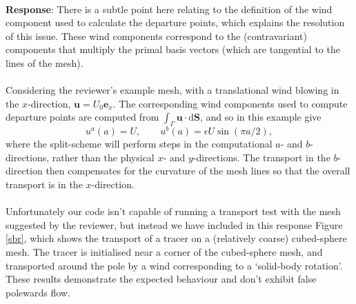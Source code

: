 \documentclass[11pt,a4paper]{article}
\begin{document}
\\
\textbf{Response}: There is a subtle point here relating to the definition of the wind component used to calculate the departure points, which explains the resolution of this issue. These wind components correspond to the (contravariant) components that multiply the primal basis vectors (which are tangential to the lines of the mesh). \\
\\
Considering the reviewer's example mesh, with a translational wind blowing in the $x$-direction, $\bm{u}=U_0 \bm{e}_x$. The corresponding wind components used to compute departure points are computed from $\int_\varGamma \bm{u \cdot}\mathrm{d}\bm{S}$, and so in this example give
\begin{equation}
u^a(a) = U, \qquad u^b(a) = \epsilon U \sin(\pi a/2),
\end{equation}
where the split-scheme will perform steps in the computational $a$- and $b$-directions, rather than the physical $x$- and $y$-directions. The transport in the $b$-direction then compensates for the curvature of the mesh lines so that the overall transport is in the $x$-direction.
\\
\\
Unfortunately our code isn't capable of running a transport test with the mesh suggested by the reviewer, but instead we have included in this response Figure \ref{sbr}, which shows the transport of a tracer on a (relatively coarse) cubed-sphere mesh. The tracer is initialised near a corner of the cubed-sphere mesh, and transported around the pole by a wind corresponding to a `solid-body rotation'. These results demonstrate the expected behaviour and don't exhibit false polewards flow. \\
\end{document}
